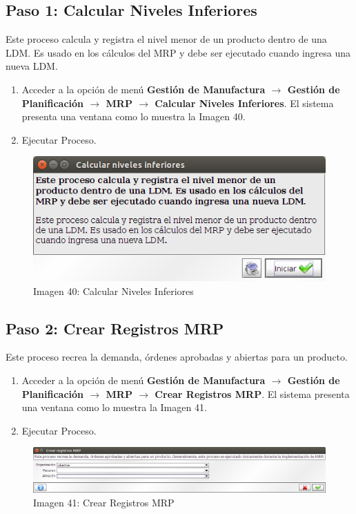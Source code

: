 \documentclass[letterpaper,10pt,spanish]{sphinxmanual}
\begin{document}
\subsection{Paso 1: Calcular Niveles Inferiores}
\label{manufactura-proceso:paso-1-calcular-niveles-inferiores}
Este proceso calcula y registra el nivel menor de un producto dentro de una LDM. Es usado en los cálculos del MRP y debe ser ejecutado cuando ingresa una nueva LDM.
\begin{enumerate}
\item {} 
Acceder a la opción de menú \textbf{Gestión de Manufactura \(\rightarrow\) Gestión de Planificación \(\rightarrow\) MRP \(\rightarrow\) Calcular Niveles Inferiores}. El sistema presenta una ventana como lo muestra la Imagen 40.

\item {} 
Ejecutar Proceso.

\end{enumerate}
\begin{figure}[htbp]
\centering
\capstart

\includegraphics{ly_mrp_niveles.png}
\caption{Imagen 40: Calcular Niveles Inferiores}\end{figure}


\subsection{Paso 2: Crear Registros MRP}
\label{manufactura-proceso:paso-2-crear-registros-mrp}
Este proceso recrea la demanda, órdenes aprobadas y abiertas para un producto.
\begin{enumerate}
\item {} 
Acceder a la opción de menú \textbf{Gestión de Manufactura \(\rightarrow\) Gestión de Planificación \(\rightarrow\) MRP \(\rightarrow\) Crear Registros MRP}. El sistema presenta una ventana como lo muestra la Imagen 41.

\item {} 
Ejecutar Proceso.

\end{enumerate}
\begin{figure}[htbp]
\centering
\capstart

\includegraphics{ly_mrp_registros.png}
\caption{Imagen 41: Crear Registros MRP}\end{figure}
\end{document}

